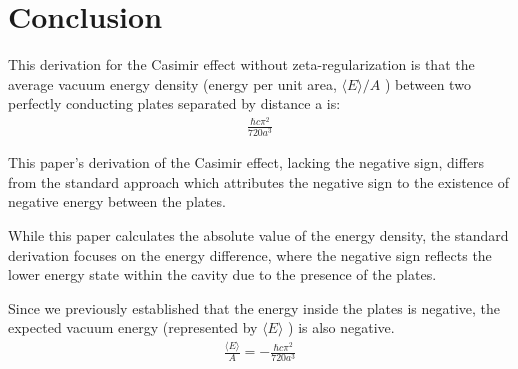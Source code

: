 \section{Conclusion}

This derivation for the Casimir effect without zeta-regularization is that the average vacuum energy density 
(energy per unit area, \(\langle E \rangle/A\) ) between two perfectly conducting plates separated by distance a is:
\begin{align}\frac{\hbar c \pi^2}{720 a^3}\end{align}

This paper's derivation of the Casimir effect, lacking the negative sign,  
differs from the standard approach which attributes the negative sign to the existence of negative energy between the plates. 

While this paper calculates the absolute value of the energy density, the standard derivation focuses on the energy difference, 
where the negative sign reflects the lower energy state within the cavity due to the presence of the plates.

Since we previously established that the energy inside the plates is negative, 
the expected vacuum energy (represented by $\langle E \rangle$ ) is also negative.
\begin{align}
    \frac{\langle E \rangle}{A} = -\frac{\hbar c \pi^2}{720 a^3}
\end{align}
